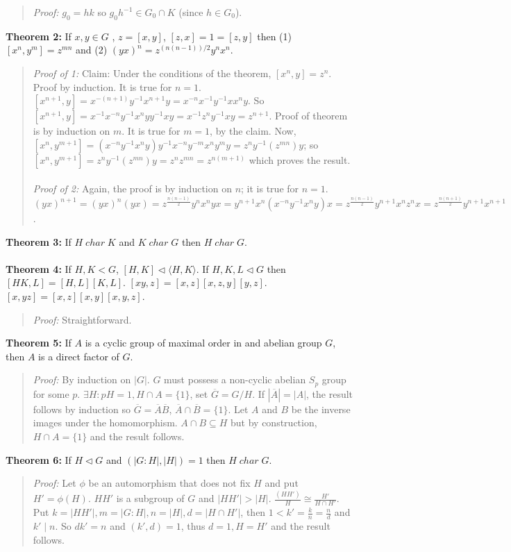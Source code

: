 \begin{quote}
\emph {Proof:} 
$g_0=hk$ so $g_0 h^{-1} \in G_0 \cap K$ (since $h \in G_0$).
\end{quote}
{\bf Theorem 2:}  If $x,y \in G$ , $z=[x,y]$, $[z, x]=1=[z,y]$ then (1) $[x^n, y^m]=z^{mn}$ and
(2) $(yx)^n= z^{(n(n-1))/2}y^n x^n$.
\begin{quote}
\emph {Proof of 1:} Claim: Under the conditions of the theorem, $[x^n,y]= z^n$.  Proof by induction.
It is true for $n=1$.  $[x^{n+1},y]= x^{-(n+1)}y^{-1}x^{n+1}y= x^{-n}x^{-1} y^{-1} x x^n y$.
So $[x^{n+1},y]= x^{-1} x^{-n} y^{-1} x^n y y^{-1} x y= x^{-1} z^n y^{-1} x y= z^{n+1}$.
Proof of theorem is by induction on $m$.  It is true for $m=1$, by the claim.  Now,
$[x^n,y^{m+1}]= (x^{-n} y^{-1} x^n y) y^{-1} x^{-n} y^{-m} x^n y^m y= z^n y^{-1} (z^{mn}) y$;
so $[x^n,y^{m+1}]= z^n y^{-1} (z^{mn}) y = z^n z^{mn}= z^{n(m+1)}$ which proves the result.
\\
\\
\emph {Proof of 2:} Again, the proof is by induction on $n$; it is true for $n=1$.
$(yx)^{n+1}= (yx)^n (yx)= 
z^{\frac {n(n-1)} {2}} y^n x^n y x= y^{n+1} x^n (x^{-n} y^{-1} x^n y) x
= z^{\frac {n(n-1)} {2}} y^{n+1} x^n z^n x= z^{\frac {n(n+1)} 2} y^{n+1} x^{n+1}$.
\end{quote}
{\bf Theorem 3:}
If  $H \; char \; K$ and $K \;  char \; G$ then $H \; char \; G$.
\\
\\
{\bf Theorem 4:}
If $H, K < G$, $[H,K] \lhd \langle H, K \rangle$.
If $H, K, L \lhd G$ then $[HK,L]= [H,L] [K, L]$. 
$[xy,z]= [x,z] [x,z,y] [y,z]$.
$[x, yz]= [x,z] [x,y] [x,y,z]$.
\begin{quote}
\emph{Proof:}  
Straightforward.
\end{quote}
{\bf Theorem 5:}
If $A$ is a cyclic group of maximal order in and abelian group $G$, then $A$ is a direct
factor of $G$.
\begin{quote}
\emph{Proof:}  
By induction on $|G|$.
$G$ must possess a non-cyclic abelian $S_p$ group for some $p$.
$\exists H: pH=1, H \cap A = \{ 1 \}$, set ${\overline G}= G/H$.
If $|{\overline A}|= |A|$, the result follows by induction so
${\overline G} = {\overline A} {\overline B}$,
${\overline A} \cap {\overline B} = \{ 1 \}$.  Let $A$ and $B$ be the inverse images
under the homomorphism.  $A \cap B \subseteq H$ but by construction, $H \cap A= \{ 1 \}$
and the result follows.
\end{quote}
{\bf Theorem 6:}
If $H \lhd G$ and $(|G:H|, |H|)=1$ then $H \; char \; G$.
\begin{quote}
\emph{Proof:}  
Let $\phi$ be an automorphism that does not fix $H$ and put $H'= \phi(H)$.
$H H'$ is a subgroup of $G$ and
$|H H'| > |H|$.  ${\frac {(H H')} {H}} \cong {\frac {H'} {H \cap H'}}$.
Put $k= |H H'|, m= |G:H|, n= |H|, d= | H \cap H' |$,  then 
$ 1 < k'= {\frac {k} {n}} =  {\frac n d}$ and $k' \mid n$.  So $dk'= n$ and $(k', d)=1$,
thus $d=1, H = H'$ and the result follows.
\end{quote}
